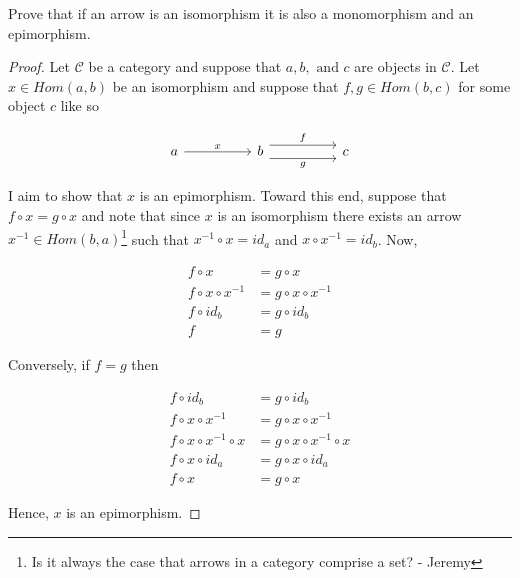 \begin{Exercise}
    Prove that if an arrow is an isomorphism it is also a monomorphism and an epimorphism. 

    \begin{proof}

        Let $\mathcal{C}$ be a category and suppose that $a,b, \text{ and }c$ are objects in $\mathcal{C}$. Let $x \in Hom(a,b)$ be an isomorphism and suppose that $f,g \in Hom(b,c)$ for some object $c$ like so 



        \[\begin{tikzcd}
        	a && b && c
        	\arrow["g"', shift right=2, from=1-3, to=1-5]
        	\arrow["f", shift left=2, from=1-3, to=1-5]
        	\arrow["x", from=1-1, to=1-3]
        \end{tikzcd}\]

        I aim to show that $x$ is an epimorphism. Toward this end, suppose that $f \circ x = g\circ x$ and note that since $x$ is an isomorphism there exists an arrow $x^{-1} \in Hom(b,a)$\footnote{Is it always the case that arrows in a category comprise a set? - Jeremy} such that  $x^{-1} \circ x = id_a$ and $x \circ x^{-1} = id_b$. Now, 

        \begin{align*}
        f \circ x &= g\circ x \\
        f \circ x \circ x^{-1} &= g \circ x \circ x^{-1} \\
        f \circ id_b &= g\circ id_b \quad  \\ 
        f &= g \quad 
        \end{align*} 

        Conversely, if $f = g$ then 

        \begin{align*}
        f \circ id_b &= g\circ id_b \quad  \\ 
        f \circ x \circ x^{-1} &= g \circ x \circ x^{-1}\quad  \\ 
        f \circ x \circ x^{-1} \circ x &= g \circ x \circ x^{-1} \circ x \\
        f \circ x \circ id_a &= g\circ x \circ id_a  \\
        f \circ x &= g\circ x 
        \end{align*} 

        Hence, $x$ is an epimorphism. 


\end{proof}
\end{Exercise}
